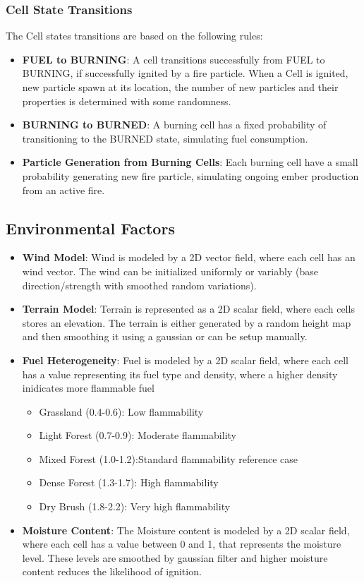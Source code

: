 \subsubsection{Cell State Transitions}
The Cell states transitions are based on the following rules:
\begin{itemize}
	\item \textbf{FUEL to BURNING}: A cell transitions successfully from FUEL to BURNING, if successfully ignited by a fire particle. When a Cell is ignited, new particle spawn at its location, the number of new particles and their properties is determined with some randomness.
	\item \textbf{BURNING to BURNED}: A burning cell has a fixed probability of transitioning to the BURNED state, simulating fuel consumption.
	\item \textbf{Particle Generation from Burning Cells}: Each burning cell have a small probability generating new fire particle, simulating ongoing ember production from an active fire.
\end{itemize}
\subsection{Environmental Factors}
\begin{itemize}
	\item \textbf{Wind Model}: Wind is modeled by a 2D vector field, where each cell has an wind vector. The wind can be initialized uniformly or variably (base direction/strength with smoothed random variations).
	\item \textbf{Terrain Model}: Terrain is represented as a 2D scalar field, where each cells stores an elevation. The terrain is either generated by a random height map and then smoothing it using a gaussian or can be setup manually.
	\item \textbf{Fuel Heterogeneity}: Fuel is modeled by a 2D scalar field, where each cell has a value representing its fuel type and density, where a higher density inidicates more flammable fuel

	      \begin{itemize}
		      \item Grassland (0.4-0.6): Low flammability
		      \item Light Forest (0.7-0.9): Moderate flammability
		      \item Mixed Forest (1.0-1.2):Standard flammability reference case
		      \item Dense Forest (1.3-1.7): High flammability
		      \item  Dry Brush (1.8-2.2): Very high flammability
	      \end{itemize}
	\item \textbf{Moisture Content}: The Moisture content is modeled by a 2D scalar field, where each cell has a value between 0 and 1, that represents the moisture level. These levels are smoothed by gaussian filter and higher moisture content reduces the likelihood of ignition.
\end{itemize}

